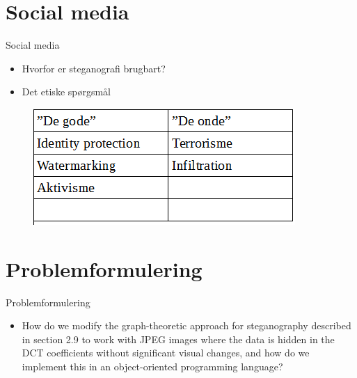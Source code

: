 \section{Social media}
\begin{frame}{Social media}{}
	\begin{itemize}
		\item Hvorfor er steganografi brugbart?
		\item Det etiske spørgsmål
	\end{itemize}
	\begin{figure}[!H]
			\centering
			\includegraphics[width=.55\textwidth]{./Tessa/tabel.png}
	\end{figure}
\end{frame}

\section{Problemformulering}
\begin{frame}{Problemformulering}{}
	\begin{itemize}
		\item How do we modify the graph-theoretic approach for steganography described in section 2.9 to work with JPEG images where the data is hidden in the DCT coefficients without significant visual changes, and how do we implement this in an object-oriented programming language?
	\end{itemize}
\end{frame}
